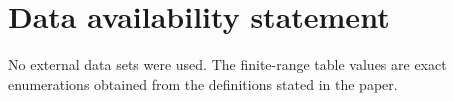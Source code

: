 \section*{Data availability statement}

No external data sets were used. The finite-range table values are exact enumerations obtained from the definitions stated in the paper.
